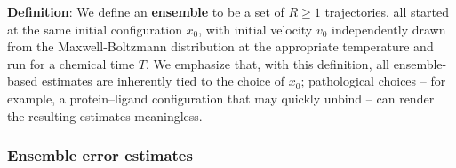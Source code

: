 \documentclass[9pt,bestpractices]{livecoms}
\begin{document}




\textbf{Definition}:
We define an \textbf{ensemble} to be a set of $R \geqslant 1$ trajectories, all started at the same initial configuration $x_0$, with initial velocity $v_0$ independently drawn from the Maxwell-Boltzmann distribution at the appropriate temperature and run for a chemical time $T$. We emphasize that, with this definition, all ensemble-based estimates are inherently tied to the choice of $x_0$; pathological choices  -- for example, a protein–ligand configuration that may quickly unbind -- can render the resulting estimates meaningless.

\subsubsection{Ensemble error estimates}
\end{document}
